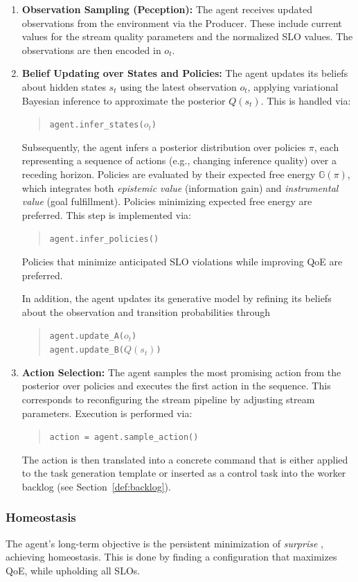 \begin{enumerate}
    \item \textbf{Observation Sampling (Peception):} The agent receives updated observations from the environment via the Producer. These include current values for the stream quality parameters and the normalized SLO values. The observations are then encoded in \(o_t\).

    \item \textbf{Belief Updating over States and Policies:} The agent updates its beliefs about hidden states $s_t$ using the latest observation \(o_t\), applying variational Bayesian inference to approximate the posterior \(Q(s_t)\). This is handled via:
    \begin{quote}
        \texttt{agent.infer\_states(\(o_t\))}
    \end{quote}
    Subsequently, the agent infers a posterior distribution over policies $\pi$, each representing a sequence of actions (e.g., changing inference quality) over a receding horizon. Policies are evaluated by their expected free energy $\mathbb{G}(\pi)$, which integrates both \emph{epistemic value} (information gain) and \emph{instrumental value} (goal fulfillment). Policies minimizing expected free energy are preferred. This step is implemented via:
    \begin{quote}
        \texttt{agent.infer\_policies()}
    \end{quote}
     Policies that minimize anticipated SLO violations while improving QoE are preferred.

     In addition, the agent updates its generative model by refining its beliefs about the observation and transition probabilities through
    \begin{quote}
        \texttt{agent.update\_A(\(o_t\))} \\
        \texttt{agent.update\_B(\(Q(s_t)\))}
    \end{quote}
    
    \item \textbf{Action Selection:} The agent samples the most promising action from the posterior over policies and executes the first action in the sequence. This corresponds to reconfiguring the stream pipeline by adjusting stream parameters. Execution is performed via:
    \begin{quote}
        \texttt{action = agent.sample\_action()}
    \end{quote}
    The action is then translated into a concrete command that is either applied to the task generation template or inserted as a control task into the worker backlog (see Section~\ref{def:backlog}).
\end{enumerate}

\subsubsection{Homeostasis}
The agent's long-term objective is the persistent minimization of \textit{surprise} \cite{sedlak_adaptive_2024}, achieving homeostasis. This is done by finding a configuration that maximizes QoE, while upholding all SLOs.